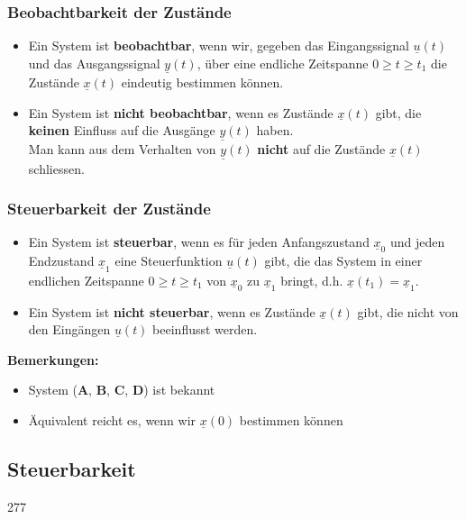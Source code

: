 \subsubsection*{Beobachtbarkeit der Zustände}

\begin{itemize}
    \item Ein System ist \textbf{beobachtbar}, wenn wir, gegeben das Eingangssignal $\underline{u}(t)$ und das Ausgangssignal $\underline{y}(t)$,
        über eine endliche Zeitspanne $0 \geq t \geq t_1$ die Zustände $\underline{x}(t)$ eindeutig bestimmen können. 
    \item Ein System ist \textbf{nicht beobachtbar}, wenn es Zustände $\underline{x}(t)$ gibt, die \textbf{keinen} Einfluss
        auf die Ausgänge $\underline{y}(t)$ haben. \\   
        \textrightarrow Man kann aus dem Verhalten von $\underline{y}(t)$ \textbf{nicht} auf die Zustände $\underline{x}(t)$ schliessen.
\end{itemize}


\subsubsection*{Steuerbarkeit der Zustände}

\begin{itemize}
    \item Ein System ist \textbf{steuerbar}, wenn es für jeden Anfangszustand $\underline{x}_0$ und jeden Endzustand $\underline{x}_1$
        eine Steuerfunktion $\underline{u}(t)$ gibt, die das System in einer endlichen Zeitspanne $0 \geq t \geq t_1$ von
        $\underline{x}_0$ zu $\underline{x}_1$ bringt, d.h. $\underline{x}(t_1) = \underline{x}_1$. 
    \item Ein System ist \textbf{nicht steuerbar}, wenn es Zustände $\underline{x}(t)$ gibt, die nicht von den 
        Eingängen $\underline{u}(t)$ beeinflusst werden. 
\end{itemize}

\vspace{0.2cm}
\textbf{Bemerkungen: }
\begin{itemize}
    \item System ($\bm{A}$, $\bm{B}$, $\bm{C}$, $\bm{D}$) ist bekannt 
    \item Äquivalent reicht es, wenn wir $\underline{x}(0)$ bestimmen können
\end{itemize}
    

\subsection{Steuerbarkeit}{277}

